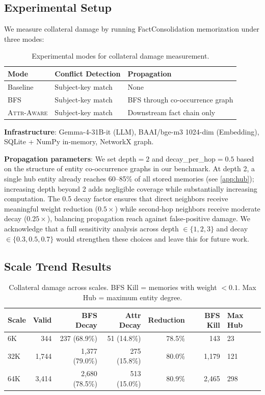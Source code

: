 \documentclass[11pt]{article}
\newcommand{\attraware}{\textsc{Attr-Aware}}
\newcommand{\bfsprop}{\textsc{BFS}}
\begin{document}
\subsection{Experimental Setup}

We measure collateral damage by running FactConsolidation memorization under three modes:

\begin{table}[htbp]
\centering
\small
\begin{tabular}{lll}
\toprule
\textbf{Mode} & \textbf{Conflict Detection} & \textbf{Propagation} \\
\midrule
Baseline & Subject-key match & None \\
\bfsprop{} & Subject-key match & BFS through co-occurrence graph \\
\attraware{} & Subject-key match & Downstream fact chain only \\
\bottomrule
\end{tabular}
\caption{Experimental modes for collateral damage measurement.}
\label{tab:modes}
\end{table}

\textbf{Infrastructure}: Gemma-4-31B-it (LLM), BAAI/bge-m3 1024-dim (Embedding), SQLite + NumPy in-memory, NetworkX graph.

\textbf{Propagation parameters}: We set depth${}=2$ and decay\_per\_hop${}=0.5$ based on the structure of entity co-occurrence graphs in our benchmark. At depth 2, a single hub entity already reaches 60--85\% of all stored memories (see \cref{app:hub}); increasing depth beyond 2 adds negligible coverage while substantially increasing computation. The 0.5 decay factor ensures that direct neighbors receive meaningful weight reduction ($0.5\times$) while second-hop neighbors receive moderate decay ($0.25\times$), balancing propagation reach against false-positive damage. We acknowledge that a full sensitivity analysis across depth $\in \{1,2,3\}$ and decay $\in \{0.3, 0.5, 0.7\}$ would strengthen these choices and leave this for future work.

\subsection{Scale Trend Results}

\begin{table}[htbp]
\centering
\small
\begin{tabular}{lrrrrrl}
\toprule
\textbf{Scale} & \textbf{Valid} & \textbf{BFS Decay} & \textbf{Attr Decay} & \textbf{Reduction} & \textbf{BFS Kill} & \textbf{Max Hub} \\
\midrule
6K   & 344   & 237 (68.9\%) & 51 (14.8\%) & 78.5\% & 143  & 23 \\
32K  & 1,744 & 1,377 (79.0\%) & 275 (15.8\%) & 80.0\% & 1,179 & 121 \\
64K  & 3,414 & 2,680 (78.5\%) & 513 (15.0\%) & 80.9\% & 2,465 & 298 \\
\bottomrule
\end{tabular}
\caption{Collateral damage across scales. BFS Kill = memories with weight $< 0.1$. Max Hub = maximum entity degree.}
\label{tab:scale_trend}
\end{table}
\end{document}
